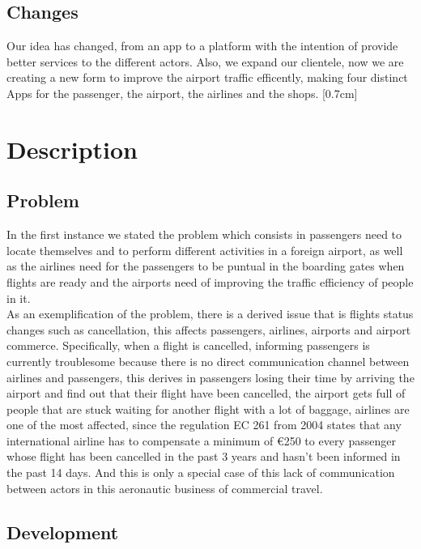 \documentclass[12pt]{article}
\begin{document}
\subsection{Changes}
Our idea has changed, from an app to a platform with the intention of provide better services to the different actors. Also, we expand our clientele, now we are creating a new form to improve the airport traffic efficently, making four distinct Apps for the passenger, the airport, the airlines and the shops.
[0.7cm]
\\
\section{Description}

\subsection{Problem}

In the first instance we stated the problem which consists in passengers need to locate themselves and to perform different activities in a foreign airport, as well as the airlines need for the passengers to be puntual in the boarding gates when flights are ready and the airports need of improving the traffic efficiency of people in it.\\

As an exemplification of the problem, there is a derived issue that is flights status changes such as cancellation, this affects passengers, airlines, airports and airport commerce. Specifically, when a flight is cancelled, informing passengers is currently troublesome because there is no direct communication channel between airlines and passengers, this derives in passengers losing their time by arriving the airport and find out that their flight have been cancelled, the airport gets full of people that are stuck waiting for another flight with a lot of baggage, airlines are one of the most affected, since the regulation EC 261 from 2004 states that any international airline has to compensate a minimum of €250 to every passenger whose flight has been cancelled in the past 3 years and hasn't been informed in the past 14 days. And this is only a special case of this lack of communication between actors in this aeronautic business of commercial travel.\\

\subsection{Development}
\end{document}
